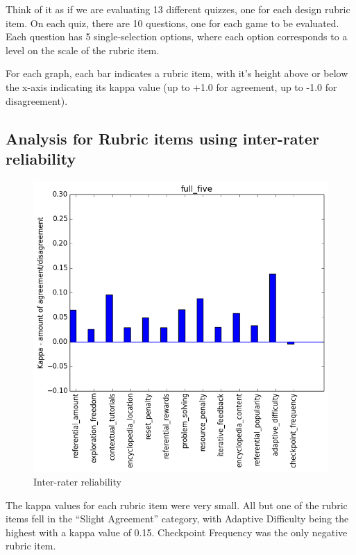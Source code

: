 				Think of it as if we are evaluating 13 different quizzes, one for each design rubric item. On each quiz, there are 10 questions, one for each game to be evaluated. Each question has 5 single-selection options, where each option corresponds to a level on the scale of the rubric item.

				For each graph, each bar indicates a rubric item, with it's height above or below the x-axis indicating its kappa value (up to +1.0 for agreement, up to -1.0 for disagreement).

			\subsection{Analysis for Rubric items using inter-rater reliability}
				\begin{figure}[] 
					\centering 
					\includegraphics[width=\textwidth, height=.4\textheight, keepaspectratio=true]{full_five_stats.png} 
					\caption{Inter-rater reliability}
				\end{figure}

				The kappa values for each rubric item were very small. All but one of the rubric items fell in the ``Slight Agreement'' category, with Adaptive Difficulty being the highest with a kappa value of 0.15. Checkpoint Frequency was the only negative rubric item. 

